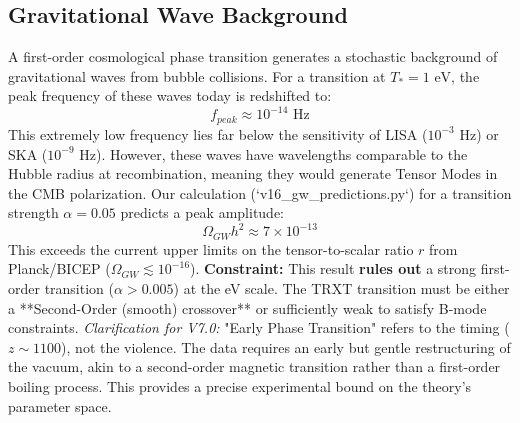 \subsection{Gravitational Wave Background}
A first-order cosmological phase transition generates a stochastic background of gravitational waves from bubble collisions.
For a transition at $T_* = 1 \text{ eV}$, the peak frequency of these waves today is redshifted to:
\begin{equation}
    f_{peak} \approx 10^{-14} \text{ Hz}
\end{equation}
This extremely low frequency lies far below the sensitivity of LISA ($10^{-3}$ Hz) or SKA ($10^{-9}$ Hz). However, these waves have wavelengths comparable to the Hubble radius at recombination, meaning they would generate Tensor Modes in the CMB polarization.
Our calculation (`v16_gw_predictions.py`) for a transition strength $\alpha = 0.05$ predicts a peak amplitude:
\begin{equation}
    \Omega_{GW} h^2 \approx 7 \times 10^{-13}
\end{equation}
This exceeds the current upper limits on the tensor-to-scalar ratio $r$ from Planck/BICEP ($\Omega_{GW} \lesssim 10^{-16}$).
\textbf{Constraint:} This result \textbf{rules out} a strong first-order transition ($\alpha > 0.005$) at the eV scale. The TRXT transition must be either a **Second-Order (smooth) crossover** or sufficiently weak to satisfy B-mode constraints. 
\textit{Clarification for V7.0:} "Early Phase Transition" refers to the timing ($z \sim 1100$), not the violence. The data requires an early but gentle restructuring of the vacuum, akin to a second-order magnetic transition rather than a first-order boiling process.
This provides a precise experimental bound on the theory's parameter space.

